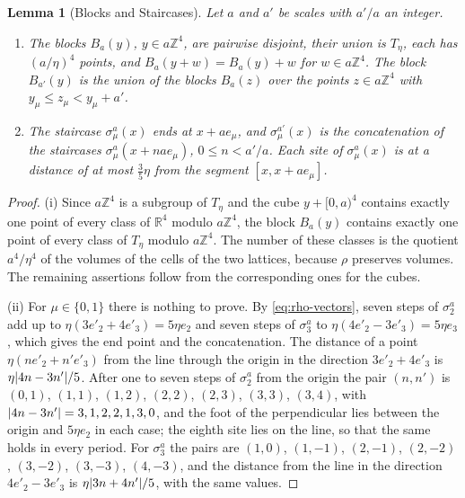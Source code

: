 \documentclass[11pt]{preprint}
\DeclarePairedDelimiter{\abs}{\lvert}{\rvert}
\numberwithin{equation}{section}
\newtheorem{lemma}[theorem]{Lemma}
\theoremstyle{definition}
\theoremstyle{remark}
\theoremstyle{plain}
\begin{document}
\begin{lemma}[Blocks and Staircases]\label{lem:blocks}
Let $a$ and $a'$ be scales with $a'/a$ an integer.
\begin{enumerate}[label=(\roman*)]
\item The blocks $B_a(y)$, $y \in a\mathbb Z^4$, are pairwise disjoint, their union is $T_\eta$, each has $(a/\eta)^4$ points, and $B_a(y + w) = B_a(y) + w$ for $w \in a\mathbb Z^4$. The block $B_{a'}(y)$ is the union of the blocks $B_a(z)$ over the points $z \in a\mathbb Z^4$ with $y_\mu \leq z_\mu < y_\mu + a'$.
\item The staircase $\sigma^a_\mu(x)$ ends at $x + ae_\mu$, and $\sigma^{a'}_\mu(x)$ is the concatenation of the staircases $\sigma^a_\mu(x + nae_\mu)$, $0 \leq n < a'/a$. Each site of $\sigma^a_\mu(x)$ is at a distance of at most $\frac35\eta$ from the segment $[x, x + ae_\mu]$.
\end{enumerate}
\end{lemma}

\begin{proof}
(i) Since $a\mathbb Z^4$ is a subgroup of $T_\eta$ and the cube $y + [0, a)^4$ contains exactly one point of every class of $\mathbb R^4$ modulo $a\mathbb Z^4$, the block $B_a(y)$ contains exactly one point of every class of $T_\eta$ modulo $a\mathbb Z^4$. The number of these classes is the quotient $a^4/\eta^4$ of the volumes of the cells of the two lattices, because $\rho$ preserves volumes. The remaining assertions follow from the corresponding ones for the cubes.

(ii) For $\mu \in \{ 0, 1 \}$ there is nothing to prove. By \eqref{eq:rho-vectors}, seven steps of $\sigma^a_2$ add up to $\eta(3e'_2 + 4e'_3) = 5\eta e_2$ and seven steps of $\sigma^a_3$ to $\eta(4e'_2 - 3e'_3) = 5\eta e_3$, which gives the end point and the concatenation. The distance of a point $\eta(ne'_2 + n'e'_3)$ from the line through the origin in the direction $3e'_2 + 4e'_3$ is $\eta\abs{4n - 3n'}/5$. After one to seven steps of $\sigma^a_2$ from the origin the pair $(n, n')$ is $(0, 1)$, $(1, 1)$, $(1, 2)$, $(2, 2)$, $(2, 3)$, $(3, 3)$, $(3, 4)$, with $\abs{4n - 3n'} = 3, 1, 2, 2, 1, 3, 0$, and the foot of the perpendicular lies between the origin and $5\eta e_2$ in each case; the eighth site lies on the line, so that the same holds in every period. For $\sigma^a_3$ the pairs are $(1, 0)$, $(1, -1)$, $(2, -1)$, $(2, -2)$, $(3, -2)$, $(3, -3)$, $(4, -3)$, and the distance from the line in the direction $4e'_2 - 3e'_3$ is $\eta\abs{3n + 4n'}/5$, with the same values.
\end{proof}
\end{document}

